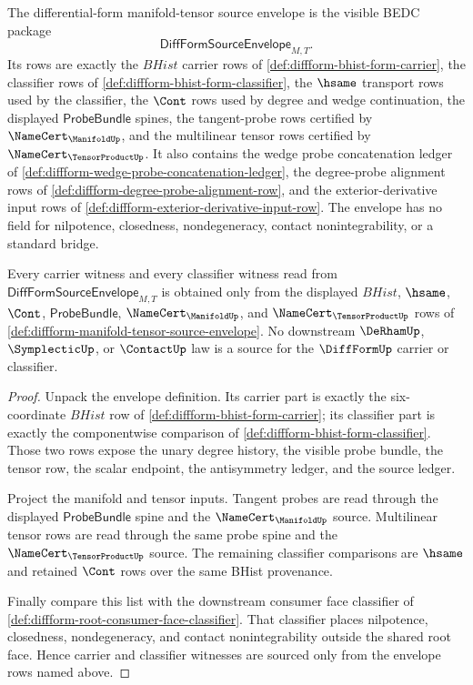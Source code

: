 \begin{definition}
\label{def:diffform-manifold-tensor-source-envelope}
The differential-form manifold-tensor source envelope is the visible BEDC
package
$$
\mathsf{DiffFormSourceEnvelope}_{M,T}.
$$
Its rows are exactly the $BHist$ carrier rows of
\autoref{def:diffform-bhist-form-carrier}, the classifier rows of
\autoref{def:diffform-bhist-form-classifier}, the $\hsame$ transport rows used
by the classifier, the $\Cont$ rows used by degree and wedge continuation, the
displayed $\mathsf{ProbeBundle}$ spines, the tangent-probe rows certified by
$\NameCert_{\ManifoldUp}$, and the multilinear tensor rows certified by
$\NameCert_{\TensorProductUp}$. It also contains the wedge probe concatenation
ledger of \autoref{def:diffform-wedge-probe-concatenation-ledger}, the
degree-probe alignment rows of
\autoref{def:diffform-degree-probe-alignment-row}, and the exterior-derivative
input rows of \autoref{def:diffform-exterior-derivative-input-row}. The
envelope has no field for nilpotence, closedness, nondegeneracy, contact
nonintegrability, or a standard bridge.
\end{definition}

\begin{theorem}
\label{thm:diffform-manifold-tensor-source-scope}
Every carrier witness and every classifier witness read from
$\mathsf{DiffFormSourceEnvelope}_{M,T}$ is obtained only from the displayed
$BHist$, $\hsame$, $\Cont$, $\mathsf{ProbeBundle}$,
$\NameCert_{\ManifoldUp}$, and $\NameCert_{\TensorProductUp}$ rows of
\autoref{def:diffform-manifold-tensor-source-envelope}. No downstream
$\DeRhamUp$, $\SymplecticUp$, or $\ContactUp$ law is a source for the
$\DiffFormUp$ carrier or classifier.
\end{theorem}
\begin{proof}
Unpack the envelope definition. Its carrier part is exactly the six-coordinate
$BHist$ row of \autoref{def:diffform-bhist-form-carrier}; its classifier part
is exactly the componentwise comparison of
\autoref{def:diffform-bhist-form-classifier}. Those two rows expose the unary
degree history, the visible probe bundle, the tensor row, the scalar endpoint,
the antisymmetry ledger, and the source ledger.

Project the manifold and tensor inputs. Tangent probes are read through the
displayed $\mathsf{ProbeBundle}$ spine and the
$\NameCert_{\ManifoldUp}$ source. Multilinear tensor rows are read through the
same probe spine and the $\NameCert_{\TensorProductUp}$ source. The remaining
classifier comparisons are $\hsame$ and retained $\Cont$ rows over the same
BHist provenance.

Finally compare this list with the downstream consumer face classifier of
\autoref{def:diffform-root-consumer-face-classifier}. That classifier places
nilpotence, closedness, nondegeneracy, and contact nonintegrability outside
the shared root face. Hence carrier and classifier witnesses are sourced only
from the envelope rows named above.
\end{proof}

